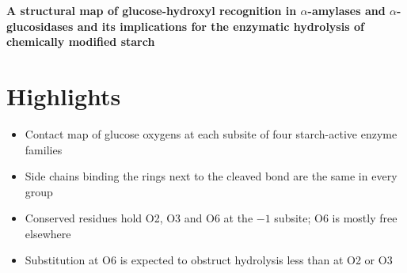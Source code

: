 \documentclass[12pt]{article}
\begin{document}
\noindent\textbf{A structural map of glucose-hydroxyl recognition in $\alpha$-amylases and $\alpha$-glucosidases and its implications for the enzymatic hydrolysis of chemically modified starch}

\section*{Highlights}
\begin{itemize}
  \item Contact map of glucose oxygens at each subsite of four starch-active enzyme families
  \item Side chains binding the rings next to the cleaved bond are the same in every group
  \item Conserved residues hold O2, O3 and O6 at the $-1$ subsite; O6 is mostly free elsewhere
  \item Substitution at O6 is expected to obstruct hydrolysis less than at O2 or O3
\end{itemize}
\end{document}
